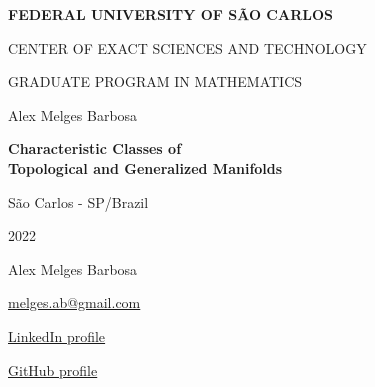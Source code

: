 \documentclass[12pt,oneside]{book}
\begin{document}
    \selectfont

    \begin{titlepage}
        \begin{center}
            \textbf{FEDERAL UNIVERSITY OF SÃO CARLOS}
        \end{center}

        \vspace{-0.8cm}

        \begin{center}  
            \fontsize{10}{12}\selectfont CENTER OF EXACT SCIENCES AND TECHNOLOGY
        \end{center}

        \vspace{-0.8cm}

        \begin{center}
            \fontsize{10}{12}\selectfont GRADUATE PROGRAM IN MATHEMATICS
        \end{center}

        \vspace{3cm}

        \begin{center}
            \small{Alex Melges Barbosa}
        \end{center}

        \vspace{3cm}

        \begin{center}
            \Large{\textbf{Characteristic Classes of \\ Topological and Generalized Manifolds}}
        \end{center}

        \vspace{10cm}

        \begin{center}
            São Carlos - SP/Brazil
        \end{center}

        \vspace{-0.8cm}

        \begin{center}
            2022
        \end{center}
    \end{titlepage}



    \newpage
    \thispagestyle{empty}

    \begin{center}
        \small{Alex Melges Barbosa}

        \scriptsize{\href{mailto:exemplo@dominio.com}{\textcolor{navyblue}{melges.ab@gmail.com}}}

        \scriptsize{\href{https://www.linkedin.com/in/alexmelgesbarbosa/}{ \textcolor{navyblue}{LinkedIn profile}}}

        \scriptsize{\href{https://github.com/alex-melges}{\textcolor{navyblue}{GitHub profile}}}
    \end{center}
\end{document}
